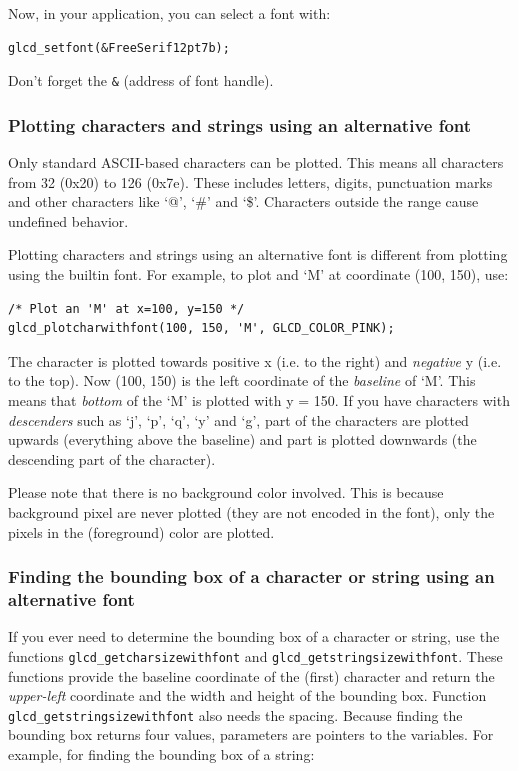 \documentclass[12pt]{article}
\begin{document}
Now, in your application, you can select a font with:

\begin{lstlisting}
glcd_setfont(&FreeSerif12pt7b);
\end{lstlisting}

Don't forget the \lstinline|&| (address of font handle).

\subsubsection{Plotting characters and strings using an alternative font}
Only standard ASCII-based characters can be plotted. This means all characters from 32 (0x20) to 126 (0x7e). These includes letters, digits, punctuation marks and other characters like `@', `\#' and `\$'. Characters outside the range cause undefined behavior.

Plotting characters and strings using an alternative font is different from plotting using the builtin font. For example, to plot and `M' at coordinate (100, 150), use:

\begin{lstlisting}
/* Plot an 'M' at x=100, y=150 */
glcd_plotcharwithfont(100, 150, 'M', GLCD_COLOR_PINK);
\end{lstlisting}

The character is plotted towards positive x (i.e. to the right) and \textsl{negative} y (i.e. to the top). Now (100, 150) is the left coordinate of the \textsl{baseline} of `M'. This means that \textsl{bottom} of the `M' is plotted with y = 150. If you have characters with \textsl{descenders} such as `j', `p', `q', `y' and `g', part of the characters are plotted upwards (everything above the baseline) and part is plotted downwards (the descending part of the character).

Please note that there is no background color involved. This is because background pixel are never plotted (they are not encoded in the font), only the pixels in the (foreground) color are plotted.

\subsubsection{Finding the bounding box of a character or string using an alternative font}
If you ever need to determine the bounding box of a character or string, use the functions \lstinline|glcd_getcharsizewithfont| and \lstinline|glcd_getstringsizewithfont|. These functions provide the baseline coordinate of the (first) character and return the \textsl{upper-left} coordinate and the width and height of the bounding box. Function \lstinline|glcd_getstringsizewithfont| also needs the spacing. Because finding the bounding box returns four values, parameters are pointers to the variables. For example, for finding the bounding box of a string:
\end{document}
